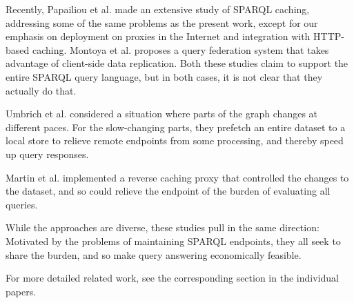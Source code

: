 Recently, Papailiou et al. \cite{papailiou2015graph} made an extensive
study of SPARQL caching, addressing some of the same problems as the
present work, except for our emphasis on deployment on proxies in the
Internet and integration with HTTP-based caching.  Montoya et
al. \cite{DBLP:journals/corr/MontoyaSMV15} proposes a query federation
system that takes advantage of client-side data replication. Both
these studies claim to support the entire SPARQL query language, but
in both cases, it is not clear that they actually do that.

Umbrich et al. \cite{umbrich2012hybrid} considered a situation where
parts of the graph changes at different paces. For the slow-changing
parts, they prefetch an entire dataset to a local store to relieve
remote endpoints from some processing, and thereby speed up query
responses. 

Martin et al. \cite{sparqlproxy} implemented a reverse caching proxy
that controlled the changes to the dataset, and so could relieve the
endpoint of the burden of evaluating all queries.

While the approaches are diverse, these studies pull in the same
direction: Motivated by the problems of maintaining SPARQL endpoints,
they all seek to share the burden, and so make query answering
economically feasible.

For more detailed related work, see the corresponding section in the
individual papers.
